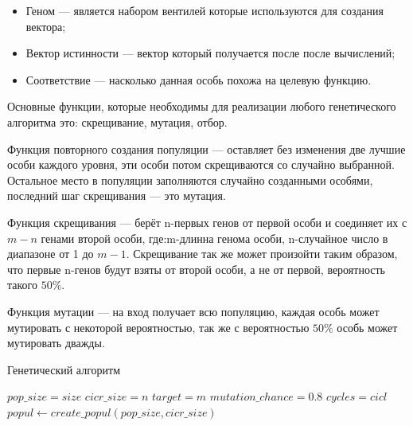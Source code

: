 \documentclass[14pt]{extarticle} %
\begin{document}
\begin{itemize}
	\item Геном --- является набором вентилей которые используются для создания вектора;
	
	\item Вектор истинности --- вектор который получается после после вычислений;
	\item  Соответствие --- насколько данная особь похожа на целевую функцию.
\end{itemize}
Основные функции, которые необходимы для реализации любого генетического алгоритма это: скрещивание, мутация, отбор.
	
Функция повторного создания популяции --- оставляет без изменения две лучшие особи каждого уровня, эти особи потом скрещиваются со случайно выбранной. Остальное место в популяции заполняются случайно созданными особями, последний шаг скрещивания --- это мутация.


Функция скрещивания --- берёт n-первых генов от первой особи и соединяет их с $m-n$ генами второй особи, где:m-длинна генома особи, n-случайное число в диапазоне от 1 до $m-1$. Скрещивание так же может произойти таким образом, что первые n-генов будут взяты от второй особи, а не от первой, вероятность такого $50\%$.



Функция мутации --- на вход получает всю популяцию, каждая особь может мутировать с некоторой вероятностью, так же с вероятностью $50\%$ особь может мутировать дважды.





 \begin{algorithm}[h]
	\caption{Генетический алгоритм}\label{alg:Examples_gen}
	\begin{algorithmic}[1]
		
		
		
		\State $pop\_size=size$
		\State $cicr\_size=n$
		\State $target=m$
		\State $mutation\_chance=0.8$
		\State $cycles=cicl$
		\State $popul\leftarrow create\_popul(pop\_size,cicr\_size)$
		\State{}
		\EndProcedure
		
		
	\end{algorithmic}
\end{algorithm}
\end{document}
